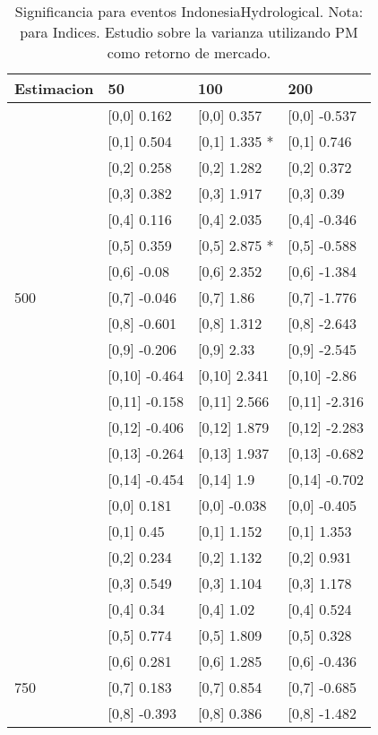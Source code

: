 \begin{table}

\caption{Significancia para eventos IndonesiaHydrological. Nota: para Indices. Estudio sobre la varianza utilizando PM como retorno de mercado.}
\centering
\begin{tabular}[t]{llll}
\toprule
Estimacion & 50 & 100 & 200\\
\midrule
 & {}[0,0] 0.162 & {}[0,0] 0.357 & {}[0,0] -0.537\\
 & {}[0,1] 0.504 & {}[0,1] 1.335 * & {}[0,1] 0.746\\
 & {}[0,2] 0.258 & {}[0,2] 1.282 & {}[0,2] 0.372\\
 & {}[0,3] 0.382 & {}[0,3] 1.917 & {}[0,3] 0.39\\
 & {}[0,4] 0.116 & {}[0,4] 2.035 & {}[0,4] -0.346\\
\addlinespace
 & {}[0,5] 0.359 & {}[0,5] 2.875 * & {}[0,5] -0.588\\
 & {}[0,6] -0.08 & {}[0,6] 2.352 & {}[0,6] -1.384\\
500 & {}[0,7] -0.046 & {}[0,7] 1.86 & {}[0,7] -1.776\\
 & {}[0,8] -0.601 & {}[0,8] 1.312 & {}[0,8] -2.643\\
 & {}[0,9] -0.206 & {}[0,9] 2.33 & {}[0,9] -2.545\\
\addlinespace
 & {}[0,10] -0.464 & {}[0,10] 2.341 & {}[0,10] -2.86\\
 & {}[0,11] -0.158 & {}[0,11] 2.566 & {}[0,11] -2.316\\
 & {}[0,12] -0.406 & {}[0,12] 1.879 & {}[0,12] -2.283\\
 & {}[0,13] -0.264 & {}[0,13] 1.937 & {}[0,13] -0.682\\
 & {}[0,14] -0.454 & {}[0,14] 1.9 & {}[0,14] -0.702\\
\addlinespace
 & {}[0,0] 0.181 & {}[0,0] -0.038 & {}[0,0] -0.405\\
 & {}[0,1] 0.45 & {}[0,1] 1.152 & {}[0,1] 1.353\\
 & {}[0,2] 0.234 & {}[0,2] 1.132 & {}[0,2] 0.931\\
 & {}[0,3] 0.549 & {}[0,3] 1.104 & {}[0,3] 1.178\\
 & {}[0,4] 0.34 & {}[0,4] 1.02 & {}[0,4] 0.524\\
\addlinespace
 & {}[0,5] 0.774 & {}[0,5] 1.809 & {}[0,5] 0.328\\
 & {}[0,6] 0.281 & {}[0,6] 1.285 & {}[0,6] -0.436\\
750 & {}[0,7] 0.183 & {}[0,7] 0.854 & {}[0,7] -0.685\\
 & {}[0,8] -0.393 & {}[0,8] 0.386 & {}[0,8] -1.482\\

\end{tabular}
\end{table}
